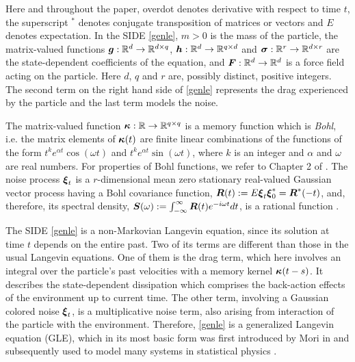 Here and throughout the paper, overdot denotes derivative with respect to time $t$, the superscript $^*$ denotes conjugate transposition of matrices or vectors and $E$ denotes expectation. In the SIDE \eqref{genle}, $m > 0$ is the mass of the particle, the matrix-valued functions $\boldsymbol{g}: \mathbb{R}^{d} \to \mathbb{R}^{d \times q}$, $\boldsymbol{h} : \mathbb{R}^{d} \to \mathbb{R}^{q \times d}$ and $\boldsymbol{\sigma}: \mathbb{R}^{r} \to \mathbb{R}^{d \times r}$ are the state-dependent coefficients of the equation, and $\boldsymbol{F} :\mathbb{R}^{d} \to \mathbb{R}^{d}$ is a force field acting on the particle. Here $d$, $q$ and $r$ are, possibly distinct, positive integers. The second term on the right hand side of \eqref{genle} represents the drag experienced by the particle and the last term models the noise.  
 
The matrix-valued function $\boldsymbol{\kappa}: \mathbb{R} \to \mathbb{R}^{q \times q}$ is a memory function which is {\it Bohl}, i.e. the matrix elements of $\boldsymbol{\kappa}(t)$ are finite linear combinations of the functions of the form $t^k e^{\alpha t} \cos(\omega t)$ and $t^k e^{\alpha t} \sin(\omega t)$, where $k$ is an integer and $\alpha$ and $\omega$ are real numbers. For properties of Bohl functions, we refer to Chapter 2 of \cite{trentelman2002control}.  The noise process $\boldsymbol{\xi}_{t}$ is a $r$-dimensional mean zero stationary real-valued Gaussian vector process having a Bohl covariance function, $\boldsymbol{R}(t):=E \boldsymbol{\xi}_t \boldsymbol{\xi}_0^* = \boldsymbol{R}^*(-t) $, and, therefore, its spectral density, $\boldsymbol{S}(\omega) := \int_{-\infty}^{\infty} \boldsymbol{R}(t) e^{-i\omega t} dt$, is a rational function \cite{willems1980stochastic}. 



The SIDE \eqref{genle} is a non-Markovian Langevin equation, since its solution at time $t$ depends on the entire past. Two of its terms are different than those in the usual Langevin equations. One of them is the drag term, which here involves an integral over the particle's past velocities with a memory kernel $\boldsymbol{\kappa}(t-s)$. It describes the state-dependent dissipation which comprises the back-action effects of the environment up to current time. The other term, involving a Gaussian colored noise $\boldsymbol{\xi}_{t}$, is a multiplicative noise term, also arising from interaction of the particle with the environment. Therefore, \eqref{genle} is a generalized Langevin equation (GLE), which in its most basic form was first introduced by Mori in \cite{mori1965transport} and subsequently used to model many systems in statistical physics \cite{Kubo_fd,toda2012statistical,goychuk2012viscoelastic}.

